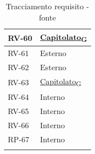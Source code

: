 \begin{longtable}{|>{\centering\arraybackslash}m{}|>{\centering\arraybackslash}m{}|}
	RV-60              & \href{https://7last.github.io/docs/rtb/documentazione-interna/glossario\#capitolato}{Capitolato\textsubscript{G}}                                                                                                                                    \\\hline
	RV-61              & Esterno                                                                                                                                                                                                                                              \\\hline
	RV-62              & Esterno                                                                                                                                                                                                                                              \\\hline
	RV-63              & \href{https://7last.github.io/docs/rtb/documentazione-interna/glossario\#capitolato}{Capitolato\textsubscript{G}}                                                                                                                                    \\\hline
	RV-64              & Interno                                                                                                                                                                                                                                              \\\hline
	RV-65              & Interno                                                                                                                                                                                                                                              \\\hline
	RV-66              & Interno                                                                                                                                                                                                                                              \\\hline
	RP-67              & Interno                                                                                                                                                                                                                                              \\\hline
	\caption{Tracciamento requisito - fonte}
\end{longtable}

